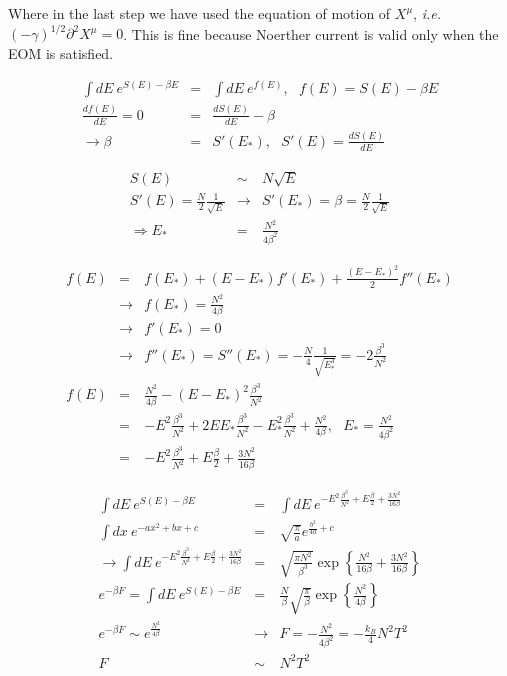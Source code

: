 \documentclass[aps,preprint,preprintnumbers,nofootinbib,showpacs,prd]{revtex4-1}
\newcommand{\ie}{{\it i.e.} }
\newcommand{\nbea}{\begin{eqnarray*}}
\newcommand{\neea}{\end{eqnarray*}}
\begin{document}
Where in the last step we have used the equation of motion of $X^\mu$, \ie $(-\gamma)^{1/2} \partial^2 X^\mu = 0$. This is fine because Noerther current is valid only when the EOM is satisfied.


\nbea
\int dE~ e^{S(E) - \beta E} & = & \int dE~ e^{f(E)}, ~~~ f(E) = S(E) - \beta E \\
\frac{d f(E)}{dE} = 0 & = & \frac{d S(E)}{dE} - \beta \\
\rightarrow \beta & = & S'(E_*), ~~~ S'(E) = \frac{d S(E)}{dE}
\neea

\nbea
S(E) & \sim & N \sqrt{E} \\
S'(E) = \frac{N}{2} \frac{1}{\sqrt{E}} & \rightarrow & S'(E_*) = \beta = \frac{N}{2} \frac{1}{\sqrt{E}}\\
\Rightarrow E_* & = & \frac{N^2}{4 \beta^2}
\neea

\nbea
f(E) & = & f(E_*) + (E - E_*) f'(E_*) + \frac{(E - E_*)^2}{2} f''(E_*) \\
& \rightarrow & f(E_*) = \frac{N^2}{4\beta}\\
& \rightarrow & f'(E_*) = 0\\
& \rightarrow & f''(E_*) = S''(E_*) = -\frac{N}{4} \frac{1}{\sqrt{E_*^3}} = -2 \frac{\beta^3}{N^2}\\
f(E) & = & \frac{N^2}{4\beta} - {(E - E_*)^2} \frac{\beta^3}{N^2} \\
& = & - {E^2} \frac{\beta^3}{N^2} + {2 E E_*} \frac{\beta^3}{N^2} - {E_*^2} \frac{\beta^3}{N^2} + \frac{N^2}{4\beta}, ~~~  E_* = \frac{N^2}{4 \beta^2}\\
& = & - {E^2} \frac{\beta^3}{N^2} + E \frac{\beta}{2} + \frac{3N^2}{16\beta}
\neea

\nbea
\int dE~ e^{S(E) - \beta E} & = & \int dE~ e^{- {E^2} \frac{\beta^3}{N^2} + E \frac{\beta}{2} + \frac{3N^2}{16\beta}}\\
\int dx ~ e^{-ax^2 + bx + c} & = & \sqrt{\frac{\pi}{a}} e^{\frac{b^2}{4a} + c} \\
\rightarrow \int dE~ e^{- {E^2} \frac{\beta^3}{N^2} + E \frac{\beta}{2} + \frac{3N^2}{16\beta}} & = & \sqrt{\frac{\pi N^2}{\beta^3}} \exp\left \{\frac{N^2}{16 \beta} + \frac{3N^2}{16\beta} \right \}\\
e^{-\beta F} = \int dE~ e^{S(E) - \beta E} & = & \frac{N}{\beta}\sqrt{\frac{\pi}{\beta}} \exp \left \{\frac{N^2}{4 \beta} \right \} \\
e^{-\beta F} \sim e ^{\frac{N^2}{4 \beta} } & \rightarrow & F = -\frac{N^2}{4\beta^2}  = - \frac{k_B}{4} N^2 T^2\\
F & \sim & N^2 T^2
\neea
\end{document}
